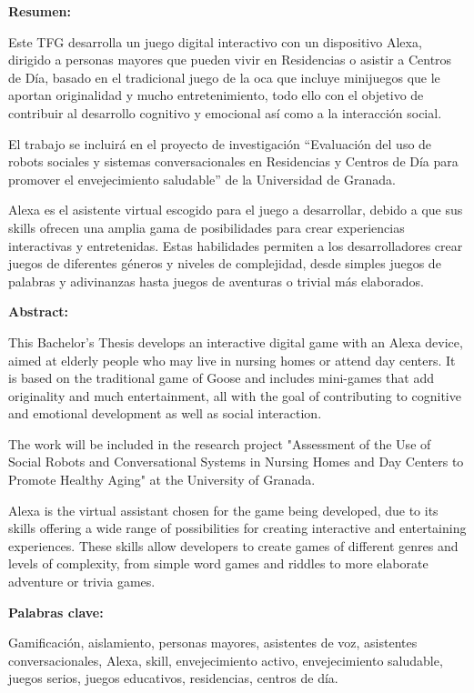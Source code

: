 \documentclass[12pt]{article}
\begin{document}
\newpage
\justifying

\textbf{Resumen:}

Este TFG desarrolla un juego digital interactivo con un dispositivo Alexa, dirigido a personas mayores que pueden vivir en Residencias o asistir a Centros de Día, basado en el tradicional juego de la oca que incluye minijuegos que le aportan originalidad y mucho entretenimiento, todo ello con el objetivo de contribuir al desarrollo cognitivo y emocional así como a la interacción social. 

El trabajo se incluirá en el proyecto de investigación “Evaluación del uso de robots sociales y sistemas conversacionales en Residencias y Centros de Día para promover el envejecimiento saludable” de la Universidad de Granada.
  
Alexa es el asistente virtual escogido para el juego a desarrollar, debido a que sus skills ofrecen una amplia gama de posibilidades para crear experiencias interactivas y entretenidas. Estas habilidades permiten a los desarrolladores crear juegos de diferentes géneros y niveles de complejidad, desde simples juegos de palabras y adivinanzas hasta juegos de aventuras o trivial más elaborados.

\vline

\textbf{Abstract:}

This Bachelor's Thesis develops an interactive digital game with an Alexa device, aimed at elderly people who may live in nursing homes or attend day centers. It is based on the traditional game of Goose and includes mini-games that add originality and much entertainment, all with the goal of contributing to cognitive and emotional development as well as social interaction.

The work will be included in the research project "Assessment of the Use of Social Robots and Conversational Systems in Nursing Homes and Day Centers to Promote Healthy Aging" at the University of Granada.

Alexa is the virtual assistant chosen for the game being developed, due to its skills offering a wide range of possibilities for creating interactive and entertaining experiences. These skills allow developers to create games of different genres and levels of complexity, from simple word games and riddles to more elaborate adventure or trivia games.

\vline

\textbf{Palabras clave:}

Gamificación, aislamiento, personas mayores, asistentes de voz, asistentes conversacionales, Alexa, skill, envejecimiento activo, envejecimiento saludable, juegos serios, juegos educativos, residencias, centros de día.
\end{document}
